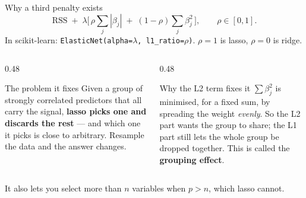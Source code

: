 \documentclass[aspectratio=169]{beamer}
\begin{document}
\begin{frame}[shrink=6]{Why a third penalty exists}
  \[
    \text{RSS} \;+\; \lambda\Big[\,\rho\sum_j |\beta_j|
      \;+\; (1-\rho)\sum_j \beta_j^2\,\Big],
    \qquad \rho \in [0, 1] .
  \]
  \small In scikit-learn: \texttt{ElasticNet(alpha=$\lambda$,
  l1\_ratio=$\rho$)}. $\rho = 1$ is lasso, $\rho = 0$ is ridge.
  \vspace{0.3em}
  \begin{columns}[T]
    \begin{column}{0.48\textwidth}
      \begin{alertblock}{The problem it fixes}
        \small Given a group of strongly correlated predictors that all carry
        the signal, \textbf{lasso picks one and discards the rest} --- and
        which one it picks is close to arbitrary. Resample the data and the
        answer changes.
      \end{alertblock}
    \end{column}
    \begin{column}{0.48\textwidth}
      \begin{block}{Why the L2 term fixes it}
        \small $\sum\beta_j^2$ is minimised, for a fixed sum, by spreading the
        weight \emph{evenly}. So the L2 part wants the group to share; the L1
        part still lets the whole group be dropped together. This is called
        the \textbf{grouping effect}.
      \end{block}
    \end{column}
  \end{columns}
  \begin{center}\small
    It also lets you select more than $n$ variables when $p > n$, which lasso
    cannot.
  \end{center}
\end{frame}
\end{document}
